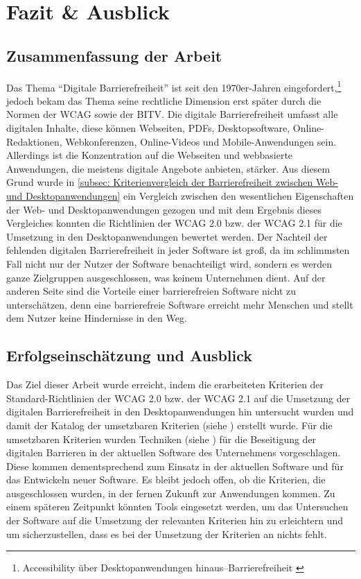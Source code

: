 \section{Fazit \& Ausblick}

\subsection{Zusammenfassung der Arbeit}
Das Thema "`Digitale Barrierefreiheit"' ist seit den 1970er-Jahren eingefordert,\footnote{Accessibility über Desktopanwendungen hinaus–Barrierefreiheit \cite{buhler2017accessibility}} jedoch bekam das Thema seine rechtliche Dimension erst später durch die Normen der \ac{WCAG} sowie der \ac{BITV}. Die digitale Barrierefreiheit umfasst alle digitalen Inhalte, diese können Webseiten, PDFs, Desktopsoftware, Online-Redaktionen, Webkonferenzen, Online-Videos und Mobile-Anwendungen sein. Allerdings ist die Konzentration auf die Webseiten und webbasierte Anwendungen, die meistens digitale Angebote anbieten, stärker. Aus diesem Grund wurde in \cref{subsec: Kriterienvergleich der Barrierefreiheit zwischen Web- und Desktopanwendungen} ein Vergleich zwischen den wesentlichen Eigenschaften der Web- und Desktopanwendungen gezogen und mit dem Ergebnis dieses Vergleiches konnten die Richtlinien der \ac{WCAG} 2.0 bzw. der \ac{WCAG} 2.1 für die Umsetzung in den Desktopanwendungen bewertet werden. Der Nachteil der fehlenden digitalen Barrierefreiheit in jeder Software ist groß, da im schlimmsten Fall nicht nur der Nutzer der Software benachteiligt wird, sondern es werden ganze Zielgruppen ausgeschlossen, was keinem Unternehmen dient. Auf der anderen Seite sind die Vorteile einer barrierefreien Software nicht zu unterschätzen, denn eine barrierefreie Software erreicht mehr Menschen und stellt dem Nutzer keine Hindernisse in den Weg.

\subsection{Erfolgseinschätzung und Ausblick}
Das Ziel dieser Arbeit wurde erreicht, indem die erarbeiteten Kriterien der Standard-Richtlinien der \ac{WCAG} 2.0 bzw. der \ac{WCAG} 2.1 auf die Umsetzung der digitalen Barrierefreiheit in den Desktopanwendungen hin untersucht wurden und damit der Katalog der umsetzbaren Kriterien (siehe ) erstellt wurde. Für die umsetzbaren Kriterien wurden Techniken (siehe ) für die Beseitigung der digitalen Barrieren in der aktuellen Software des Unternehmens vorgeschlagen. Diese kommen dementsprechend zum Einsatz in der aktuellen Software und für das Entwickeln neuer Software. Es bleibt jedoch offen, ob die Kriterien, die ausgeschlossen wurden, in der fernen Zukunft zur Anwendungen kommen. Zu einem späteren Zeitpunkt könnten Tools eingesetzt werden, um das Untersuchen der Software auf die Umsetzung der relevanten Kriterien hin zu erleichtern und um sicherzustellen, dass es bei der Umsetzung der Kriterien an nichts fehlt.

\label{seitenreinschrifft}
